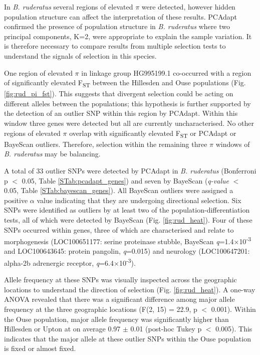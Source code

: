 \documentclass[12pt]{article}
\begin{document}
\begin{linenumbers}
		In \emph{B. ruderatus} several regions of elevated $\pi$ were detected, however hidden population structure can affect the interpretation of these results. PCAdapt confirmed the presence of population structure in \emph{B. ruderatus} where two principal components, K=2, were appropriate to explain the sample variation. It is therefore necessary to compare results from multiple selection tests to understand the signals of selection in this species.
		
		One region of elevated $\pi$ in linkage group HG995199.1 co-occurred with a region of significantly elevated F\textsubscript{ST} between the Hillesden and Ouse populations (Fig. \ref{fig:rud_pi_fst}). This suggests that divergent selection could be acting on different alleles between the populations; this hypothesis is further supported by the detection of an outlier SNP within this region by PCAdapt. Within this window three genes were detected but all are currently uncharacterised. No other regions of elevated $\pi$ overlap with significantly elevated F\textsubscript{ST} or PCAdapt or BayeScan outliers. Therefore, selection within the remaining three $\pi$ windows of \emph{B. ruderatus} may be balancing. 
		
		A total of 33 outlier SNPs were detected by PCAdapt in \emph{B. ruderatus} (Bonferroni p $<$ 0.05, Table \ref{STab:pcadapt_genes}) and seven by BayeScan (\emph{q-value} $<$ 0.05, Table \ref{STab:bayescan_genes}). All BayeScan outliers were assigned a positive $\alpha$ value indicating that they are undergoing directional selection. 
		Six SNPs were identified as outliers by at least two of the population-differentiation tests, all of which were detected by BayeScan (Fig. \ref{fig:rud_heat}). Four of these SNPs occurred within genes, three of which are characterised and relate to morphogenesis (LOC100651177: serine proteinase stubble, BayeScan \emph{q}=1.4$\times$10\textsuperscript{-3} and LOC100643645: protein pangolin, \emph{q}=0.015) and neurology (LOC100647201: alpha-2b adrenergic receptor, \emph{q}=6.4$\times$10\textsuperscript{-3}).
		
		Allele frequency at these SNPs was visually inspected across the geographic locations to understand the direction of selection (Fig. \ref{fig:rud_heat}). 
		A one-way ANOVA revealed that there was a significant difference among major allele frequency at the three geographic locations (F(2, 15) = 22.9, p $<$ 0.001).
		Within the Ouse population, major allele frequency was significantly higher than Hillesden or Upton at on average 0.97 $\pm$ 0.01 (post-hoc Tukey p $<$ 0.005). This indicates that the major allele at these outlier SNPs within the Ouse population is fixed or almost fixed. 
		

\end{linenumbers}
\end{document}
